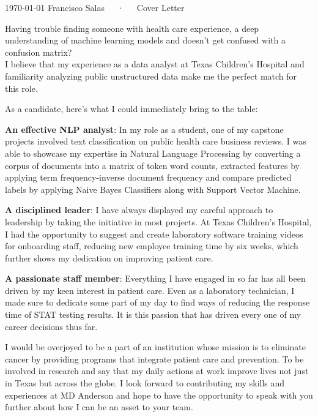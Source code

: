 \documentclass[12pt, a4paper]{awesome-cv}
\begin{document}
	
	\makecvheader[R]
	
	\makecvfooter
	{\today}
	{Francisco Salas~~~·~~~Cover Letter}
	{}
	
	\makelettertitlenew
	
	\begin{cvletter}
		
		Having trouble finding someone with health care experience, a deep understanding of machine learning models and doesn't get confused with a confusion matrix?\\
		I believe that my experience as a data analyst at Texas Children's Hospital and familiarity analyzing public unstructured data make me the perfect match for this role.
			
		As a candidate, here’s what I could immediately bring to the table:
		
		\textbf{An effective NLP analyst}: In my role as a student, one of my capstone projects involved text classification on public health care business reviews. I was able to showcase my expertise in Natural Language Processing by converting a corpus of documents into a matrix of token word counts, extracted features by applying term frequency-inverse document frequency and compare predicted labels by applying Naive Bayes Classifiers along with Support Vector Machine.
		
		\textbf{A disciplined leader}: I have always displayed my careful approach to leadership by taking the initiative in most projects. At Texas Children's Hospital, I had the opportunity to suggest and create laboratory software training videos for onboarding staff,  reducing new employee training time by six weeks, which further shows my dedication on improving patient care.
		
		\textbf{A passionate staff member}: Everything I have engaged in so far has all been driven by my keen interest in patient care. Even as a laboratory technician, I made sure to dedicate some part of my day to find ways of reducing the response time of STAT testing results. It is this passion that has driven every one of my career decisions thus far.
		
		I would be overjoyed to be a part of an institution whose mission is to eliminate cancer by providing programs that integrate patient care and prevention.  To be involved in research and say that my daily actions at work improve lives not just in Texas but across the globe. 
		I look forward to contributing my skills and experiences at MD Anderson and hope to have the opportunity to speak with you further about how I can be an asset to your team. 
		\end{cvletter}
	
	
	\makeletterclosing
	
\end{document}
